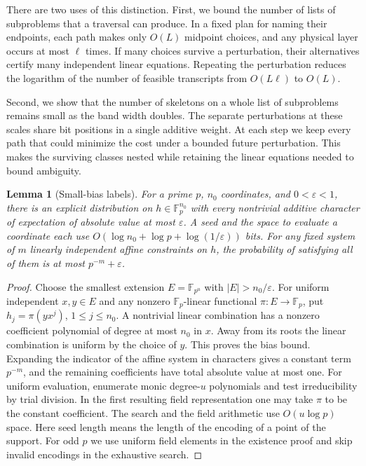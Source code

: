 \documentclass[11pt]{article}
\newtheorem{lemma}[theorem]{Lemma}
\newcommand{\F}{\mathbb F}
\begin{document}
There are two uses of this distinction. First, we bound the number of lists of
subproblems that a traversal can produce. In a fixed plan for naming
their endpoints, each path makes only $O(L)$ midpoint choices, and any
physical layer occurs at most $\ell$ times. If many choices survive
a perturbation, their alternatives certify many independent linear
equations. Repeating the perturbation reduces the logarithm of the
number of feasible transcripts from $O(L\ell)$ to $O(L)$.

Second, we show that the number of skeletons on a whole list of
subproblems remains small as the band width doubles. The separate
perturbations at these scales share bit positions in a single additive
weight. At each step we keep every path that could minimize the cost
under a bounded future perturbation. This makes the surviving classes
nested while retaining the linear equations needed to bound ambiguity.
\begin{lemma}[Small-bias labels]\label{lem:bias}
For a prime $p$, $n_0$ coordinates, and $0<\varepsilon<1$, there is an explicit
distribution on $h\in\F_p^{n_0}$ with every nontrivial additive character
of expectation of absolute value at most $\varepsilon$. A seed and the
space to evaluate a coordinate each use $O(\log n_0+\log p+\log(1/\varepsilon))$
bits. For any fixed system of $m$ linearly independent affine constraints
on $h$, the probability of satisfying all of them is at most
$p^{-m}+\varepsilon$.
\end{lemma}
\begin{proof}
Choose the smallest extension $E=\F_{p^u}$ with $|E|>n_0/\varepsilon$.
For uniform independent $x,y\in E$ and any nonzero
$\F_p$-linear functional $\pi:E\to\F_p$, put $h_j=\pi(yx^j)$, $1\le j\le n_0$.
A nontrivial linear combination has a nonzero coefficient polynomial
of degree at most $n_0$ in $x$. Away from its roots the linear combination
is uniform by the choice of $y$. This proves the bias bound.
Expanding the indicator of the affine system in characters gives a constant term
$p^{-m}$, and the remaining coefficients have total absolute value at most one.
For uniform evaluation, enumerate monic degree-$u$ polynomials and test
irreducibility by trial division. In the first resulting field representation
one may take $\pi$ to be the constant coefficient. The search and the field
arithmetic use $O(u\log p)$ space. Here seed length means the length
of the encoding of a point of the support. For odd $p$ we use uniform
field elements in the existence proof and skip invalid encodings in
the exhaustive search.
\end{proof}
\end{document}
